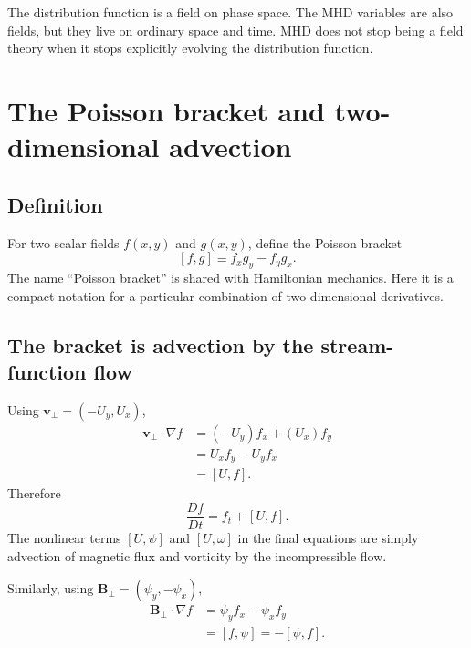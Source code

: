 \documentclass[11pt]{article}
\newcommand{\vect}[1]{\bm{#1}}
\newcommand{\bracket}[2]{\left[#1,#2\right]}
\begin{document}
\begin{checkpointbox}
The distribution function is a field on phase space. The MHD variables are also fields, but they live on ordinary space and time. MHD does not stop being a field theory when it stops explicitly evolving the distribution function.
\end{checkpointbox}



\section{The Poisson bracket and two-dimensional advection}
\label{sec:bracket}

\subsection{Definition}

For two scalar fields $f(x,y)$ and $g(x,y)$, define the Poisson bracket
\begin{equation}
\boxed{
\bracket{f}{g}
\equiv f_x g_y-f_y g_x.}
\label{eq:bracketdef}
\end{equation}
The name ``Poisson bracket'' is shared with Hamiltonian mechanics. Here it is a compact notation for a particular combination of two-dimensional derivatives.

\subsection{The bracket is advection by the stream-function flow}

Using $\vect{v}_\perp=(-U_y,U_x)$,
\begin{align}
\vect{v}_\perp\cdot\nabla f
&=(-U_y)f_x+(U_x)f_y\\
&=U_xf_y-U_yf_x\\
&=\bracket{U}{f}.
\label{eq:vadvectionbracket}
\end{align}
Therefore
\begin{equation}
\frac{Df}{Dt}=f_t+\bracket{U}{f}.
\end{equation}
The nonlinear terms $[U,\psi]$ and $[U,\omega]$ in the final equations are simply advection of magnetic flux and vorticity by the incompressible flow.

Similarly, using $\vect{B}_\perp=(\psi_y,-\psi_x)$,
\begin{align}
\vect{B}_\perp\cdot\nabla f
&=\psi_yf_x-\psi_xf_y\\
&=\bracket{f}{\psi}
=-\bracket{\psi}{f}.
\label{eq:Badvectionbracket}
\end{align}
\end{document}
